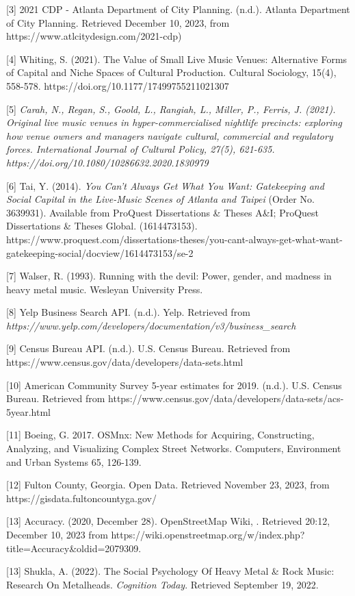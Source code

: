 \documentclass[11pt]{article}
\begin{document}
{[}3{]} 2021 CDP - Atlanta Department of City Planning. (n.d.). Atlanta Department of City Planning. Retrieved December 10, 2023, from https://www.atlcitydesign.com/2021-cdp)

{[}4{]} Whiting, S. (2021). The Value of Small Live Music Venues: Alternative Forms of Capital and Niche Spaces of Cultural Production. Cultural Sociology, 15(4), 558-578. https://doi.org/10.1177/17499755211021307

{[}5{]} \textit{Carah, N., Regan, S., Goold, L., Rangiah, L., Miller, P., Ferris, J. (2021). Original live music venues in hyper-commercialised nightlife precincts: exploring how venue owners and managers navigate cultural, commercial and regulatory forces. International Journal of Cultural Policy, 27(5), 621-635. https://doi.org/10.1080/10286632.2020.1830979}

{[}6{]} Tai, Y. (2014). \textit{You Can't Always Get What You Want: Gatekeeping and Social Capital in the Live-Music Scenes of Atlanta and Taipei} (Order No. 3639931). Available from ProQuest Dissertations \& Theses A\&I; ProQuest Dissertations \& Theses Global. (1614473153). https://www.proquest.com/dissertations-theses/you-cant-always-get-what-want-gatekeeping-social/docview/1614473153/se-2

{[}7{]} Walser, R. (1993). Running with the devil: Power, gender, and madness in heavy metal music. Wesleyan University Press.

{[}8{]} Yelp Business Search API. (n.d.). Yelp. Retrieved from \textit{https://www.yelp.com/developers/documentation/v3/business\_search}

{[}9{]} Census Bureau API. (n.d.). U.S. Census Bureau. Retrieved from https://www.census.gov/data/developers/data-sets.html

{[}10{]} American Community Survey 5-year estimates for 2019. (n.d.). U.S. Census Bureau. Retrieved from https://www.census.gov/data/developers/data-sets/acs-5year.html

{[}11{]} Boeing, G. 2017. OSMnx: New Methods for Acquiring, Constructing, Analyzing, and Visualizing Complex Street Networks. Computers, Environment and Urban Systems 65, 126-139.

{[}12{]} Fulton County, Georgia. Open Data. Retrieved November 23, 2023, from https://gisdata.fultoncountyga.gov/

{[}13{]} Accuracy. (2020, December 28). OpenStreetMap Wiki, . Retrieved 20:12, December 10, 2023 from https://wiki.openstreetmap.org/w/index.php?title=Accuracy\&oldid=2079309.

{[}13{]} Shukla, A. (2022). The Social Psychology Of Heavy Metal \& Rock Music: Research On Metalheads. \textit{Cognition Today}. Retrieved September 19, 2022.











    
    
    
\end{document}

